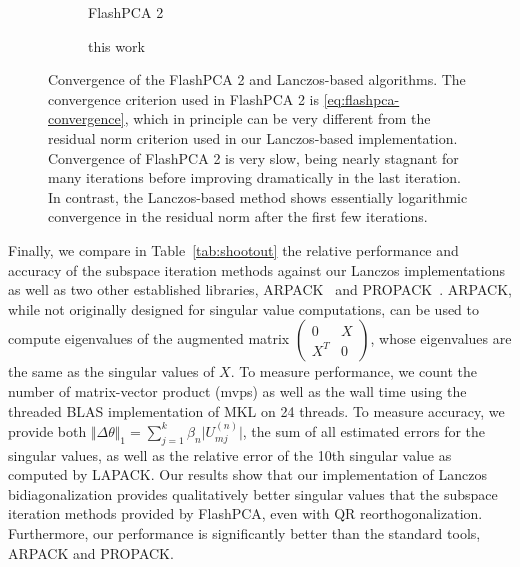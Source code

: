 \documentclass[review]{siamart0516}
\begin{document}
\begin{figure}
    \centering
    \begin{subfigure}{0.72\textwidth}
        \caption{FlashPCA 2}
    \end{subfigure}
    \begin{subfigure}{0.23\textwidth}
        \caption{this work}
    \end{subfigure}
    \caption{Convergence of the FlashPCA 2 and Lanczos-based algorithms. The
    convergence criterion used in FlashPCA 2 is \eqref{eq:flashpca-convergence},
    which in principle can be very different from the residual norm criterion used
    in our Lanczos-based implementation. Convergence of FlashPCA 2 is very slow,
    being nearly stagnant for many iterations before improving dramatically
    in the last iteration. In contrast, the Lanczos-based method shows essentially
    logarithmic convergence in the residual norm after the first few iterations.
    \label{fig:conv}
    }
\end{figure}

Finally, we compare in Table~\ref{tab:shootout} the relative performance
and accuracy of the subspace iteration methods against our Lanczos
implementations as well as two other established libraries,
ARPACK~\cite{Lehoucq1996} and PROPACK~\cite{Larsen1998}. ARPACK, while not
originally designed for singular value computations, can be used to
compute eigenvalues of the augmented matrix $\begin{pmatrix}0 & X\\X^T &
0\end{pmatrix}$, whose eigenvalues are the same as the singular values of
$X$. To measure performance, we count the number of matrix-vector product
(mvps) as well as the wall time using the threaded BLAS implementation of
MKL on 24 threads. To measure accuracy, we provide both
$\Vert\Delta\theta\Vert_1 = \sum_{j=1}^k \beta_n \vert U^{(n)}_{mj}
\vert$, the sum of all estimated errors for the singular values, as well
as the relative error of the 10th singular value
as computed by LAPACK. Our results show that our implementation of Lanczos
bidiagonalization provides qualitatively better singular values that the
subspace iteration methods provided by FlashPCA, even with QR
reorthogonalization. Furthermore, our performance is significantly better
than the standard tools, ARPACK and PROPACK.
\end{document}
